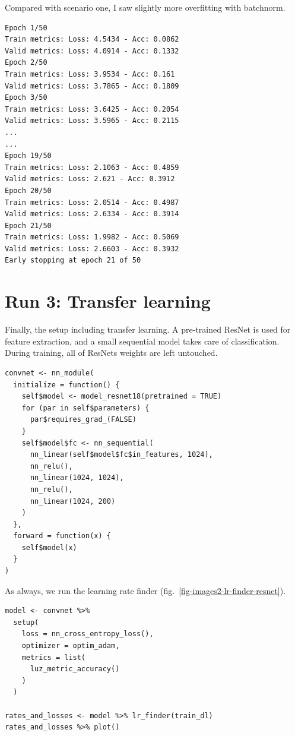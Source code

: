 \documentclass[
  letterpaper,
]{krantz}
\begin{document}
Compared with scenario one, I saw slightly more overfitting with
batchnorm.

\begin{verbatim}
Epoch 1/50
Train metrics: Loss: 4.5434 - Acc: 0.0862                                     
Valid metrics: Loss: 4.0914 - Acc: 0.1332
Epoch 2/50
Train metrics: Loss: 3.9534 - Acc: 0.161                                      
Valid metrics: Loss: 3.7865 - Acc: 0.1809
Epoch 3/50
Train metrics: Loss: 3.6425 - Acc: 0.2054                                     
Valid metrics: Loss: 3.5965 - Acc: 0.2115
...
...
Epoch 19/50
Train metrics: Loss: 2.1063 - Acc: 0.4859                                     
Valid metrics: Loss: 2.621 - Acc: 0.3912
Epoch 20/50
Train metrics: Loss: 2.0514 - Acc: 0.4987                                     
Valid metrics: Loss: 2.6334 - Acc: 0.3914
Epoch 21/50
Train metrics: Loss: 1.9982 - Acc: 0.5069                                     
Valid metrics: Loss: 2.6603 - Acc: 0.3932
Early stopping at epoch 21 of 50
\end{verbatim}

\hypertarget{run-3-transfer-learning}{%
\section{Run 3: Transfer learning}\label{run-3-transfer-learning}}

Finally, the setup including transfer learning. A pre-trained ResNet is
used for feature extraction, and a small sequential model takes care of
classification. During training, all of ResNets weights are left
untouched.

\begin{verbatim}
convnet <- nn_module(
  initialize = function() {
    self$model <- model_resnet18(pretrained = TRUE)
    for (par in self$parameters) {
      par$requires_grad_(FALSE)
    }
    self$model$fc <- nn_sequential(
      nn_linear(self$model$fc$in_features, 1024),
      nn_relu(),
      nn_linear(1024, 1024),
      nn_relu(),
      nn_linear(1024, 200)
    )
  },
  forward = function(x) {
    self$model(x)
  }
)
\end{verbatim}

As always, we run the learning rate finder
(fig.~\ref{fig-images2-lr-finder-resnet}).

\begin{verbatim}
model <- convnet %>%
  setup(
    loss = nn_cross_entropy_loss(),
    optimizer = optim_adam,
    metrics = list(
      luz_metric_accuracy()
    )
  ) 

rates_and_losses <- model %>% lr_finder(train_dl)
rates_and_losses %>% plot()
\end{verbatim}
\end{document}
